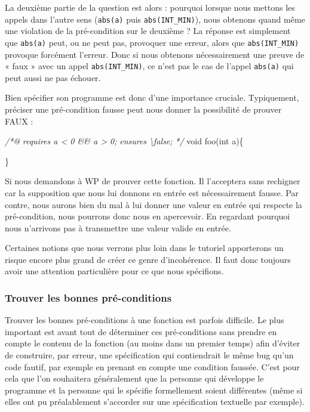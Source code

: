 \documentclass[12pt,francais,]{scrbook}
\newenvironment{Shaded}{}{}
\newcommand{\DataTypeTok}[1]{\textcolor[rgb]{0.56,0.13,0.00}{{#1}}}
\newcommand{\CommentTok}[1]{\textcolor[rgb]{0.38,0.63,0.69}{\textit{{#1}}}}
\newcommand{\NormalTok}[1]{{#1}}
\begin{document}
La deuxième partie de la question est alors : pourquoi lorsque nous
mettons les appels dans l'autre sens (\texttt{abs(a)} puis
\texttt{abs(INT\_MIN)}), nous obtenons quand même une violation de la
pré-condition sur le deuxième ? La réponse est simplement que
\texttt{abs(a)} peut, ou ne peut pas, provoquer une erreur, alors que
\texttt{abs(INT\_MIN)} provoque forcément l'erreur. Donc si nous
obtenons nécessairement une preuve de « faux » avec un appel
\texttt{abs(INT\_MIN)}, ce n'est pas le cas de l'appel \texttt{abs(a)}
qui peut aussi ne pas échouer.

Bien spécifier son programme est donc d'une importance cruciale.
Typiquement, préciser une pré-condition fausse peut nous donner la
possibilité de prouver FAUX :

\begin{footnotesize}\begin{Shaded}
\begin{Highlighting}[]
\CommentTok{/*@}
\CommentTok{  requires a < 0 && a > 0;}
\CommentTok{  ensures  \textbackslash{}false;}
\CommentTok{*/}
\DataTypeTok{void} \NormalTok{foo(}\DataTypeTok{int} \NormalTok{a)\{}

\NormalTok{\}}
\end{Highlighting}
\end{Shaded}\end{footnotesize}

Si nous demandons à WP de prouver cette fonction. Il l'acceptera sans
rechigner car la supposition que nous lui donnons en entrée est
nécessairement fausse. Par contre, nous aurons bien du mal à lui donner
une valeur en entrée qui respecte la pré-condition, nous pourrons donc
nous en apercevoir. En regardant pourquoi nous n'arrivons pas à
transmettre une valeur valide en entrée.

Certaines notions que nous verrons plus loin dans le tutoriel
apporterons un risque encore plus grand de créer ce genre d'incohérence.
Il faut donc toujours avoir une attention particulière pour ce que nous
spécifions.

\subsubsection{Trouver les bonnes
pré-conditions}\label{trouver-les-bonnes-pruxe9-conditions}

Trouver les bonnes pré-conditions à une fonction est parfois difficile.
Le plus important est avant tout de déterminer ces pré-conditions sans
prendre en compte le contenu de la fonction (au moins dans un premier
temps) afin d'éviter de construire, par erreur, une spécification qui
contiendrait le même bug qu'un code fautif, par exemple en prenant en
compte une condition faussée. C'est pour cela que l'on souhaitera
généralement que la personne qui développe le programme et la personne
qui le spécifie formellement soient différentes (même si elles ont pu
préalablement s'accorder sur une spécification textuelle par exemple).
\end{document}
